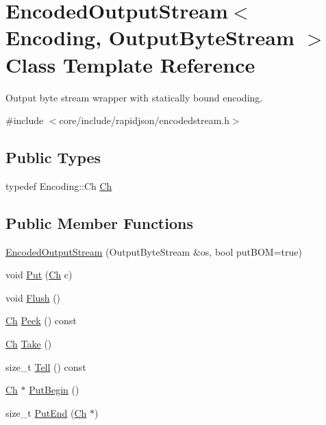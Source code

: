 \hypertarget{classEncodedOutputStream}{}\section{Encoded\+Output\+Stream$<$ Encoding, Output\+Byte\+Stream $>$ Class Template Reference}
\label{classEncodedOutputStream}


Output byte stream wrapper with statically bound encoding.  




{\ttfamily \#include $<$core/include/rapidjson/encodedstream.\+h$>$}

\subsection*{Public Types}
\begin{DoxyCompactItemize}
\item 
typedef Encoding\+::\+Ch \hyperlink{classEncodedOutputStream_aa8f494d7ee2808307fbc9cd658c0f760}{Ch}
\end{DoxyCompactItemize}
\subsection*{Public Member Functions}
\begin{DoxyCompactItemize}
\item 
\hyperlink{classEncodedOutputStream_ad3360c613a30a6a15526ae9ad63bd004}{Encoded\+Output\+Stream} (Output\+Byte\+Stream \&os, bool put\+B\+OM=true)
\item 
void \hyperlink{classEncodedOutputStream_a0f3c00f94c195a38d78c05ecda497481}{Put} (\hyperlink{classEncodedOutputStream_aa8f494d7ee2808307fbc9cd658c0f760}{Ch} c)
\item 
void \hyperlink{classEncodedOutputStream_a657188f6a9f0fae01a4012c288d3fd46}{Flush} ()
\item 
\hyperlink{classEncodedOutputStream_aa8f494d7ee2808307fbc9cd658c0f760}{Ch} \hyperlink{classEncodedOutputStream_aa1dbe6b921fe788f3229024fb5598647}{Peek} () const 
\item 
\hyperlink{classEncodedOutputStream_aa8f494d7ee2808307fbc9cd658c0f760}{Ch} \hyperlink{classEncodedOutputStream_a90f5a5e1598316a417ef5b6ad3d49f36}{Take} ()
\item 
size\+\_\+t \hyperlink{classEncodedOutputStream_ab580ac97f1a22c2a6abc4a31bb5c8272}{Tell} () const 
\item 
\hyperlink{classEncodedOutputStream_aa8f494d7ee2808307fbc9cd658c0f760}{Ch} $\ast$ \hyperlink{classEncodedOutputStream_a78934de4f76c9fa65238e65d3630cbc5}{Put\+Begin} ()
\item 
size\+\_\+t \hyperlink{classEncodedOutputStream_a818695f6d3fa8896e9d7d0fbdc7d4514}{Put\+End} (\hyperlink{classEncodedOutputStream_aa8f494d7ee2808307fbc9cd658c0f760}{Ch} $\ast$)
\end{DoxyCompactItemize}


